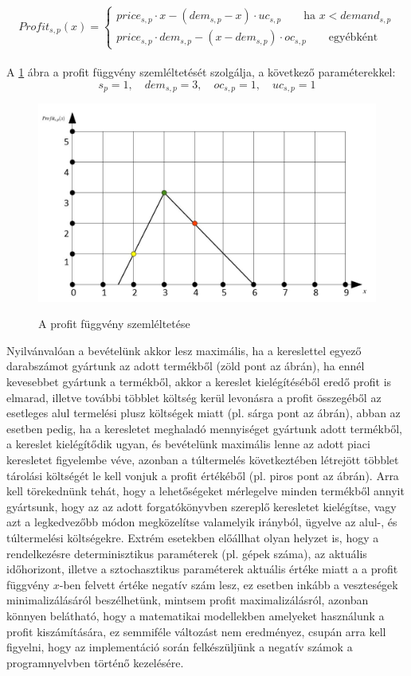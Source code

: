\documentclass [12pt]{report}
\begin{document}
\begin{equation*}
Profit_{s,p}(x)= \begin{cases}
            price_{s,p}\cdot x-(dem_{s,p}-x) \cdot uc_{s,p}\qquad \text{ha } x<demand_{s,p} \\
            price_{s,p} \cdot dem_{s,p}-(x-dem_{s,p}) \cdot oc_{s,p}\qquad \text{egyébként}
       \end{cases}
\end{equation*}\\
A \ref{profit_func} ábra a profit függvény szemléltetését szolgálja, a következő paraméterekkel:
$$s_p=1,\quad dem_{s,p}=3, \quad oc_{s,p}=1, \quad  uc_{s,p}=1$$
\begin{figure}
\begin{center}
\includegraphics[scale=0.5]{profit_func}\\
\caption{A profit függvény szemléltetése}
\label{profit_func}
\end{center}
\end{figure}
Nyilvánvalóan a bevételünk akkor lesz maximális, ha a kereslettel egyező darabszámot gyártunk az adott termékből (zöld pont az ábrán), ha ennél kevesebbet gyártunk a termékből, akkor a kereslet kielégítéséből eredő profit is elmarad, illetve további többlet költség kerül levonásra a profit összegéből az esetleges alul termelési plusz költségek miatt (pl. sárga pont az ábrán), abban az esetben pedig, ha a keresletet meghaladó mennyiséget gyártunk adott termékből, a kereslet kielégítődik ugyan, és bevételünk maximális lenne az adott piaci keresletet figyelembe véve, azonban a túltermelés következtében létrejött többlet tárolási költségét le kell vonjuk a profit értékéből (pl. piros pont az ábrán). Arra kell törekednünk tehát, hogy a lehetőségeket mérlegelve minden termékből annyit gyártsunk, hogy az az adott forgatókönyvben szereplő keresletet kielégítse, vagy azt a legkedvezőbb módon megközelítse valamelyik irányból, ügyelve az alul-, és túltermelési költségekre. Extrém esetekben előállhat olyan helyzet is, hogy a rendelkezésre determinisztikus paraméterek (pl. gépek száma), az aktuális időhorizont, illetve a sztochasztikus paraméterek aktuális értéke miatt a a profit függvény $x$-ben felvett értéke negatív szám lesz, ez esetben inkább a veszteségek minimalizálásáról beszélhetünk, mintsem profit maximalizálásról, azonban könnyen belátható, hogy a matematikai modellekben amelyeket használunk a profit kiszámítására, ez semmiféle változást nem eredményez, csupán arra kell figyelni, hogy az implementáció során felkészüljünk a negatív számok a programnyelvben történő kezelésére.
\end{document}
